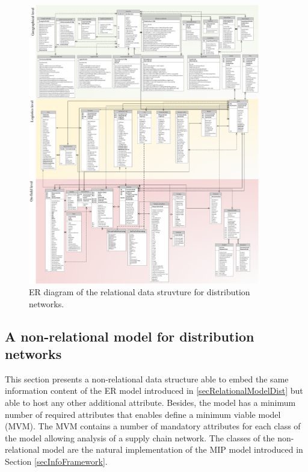 \begin{figure}[hbt!]
\centering
\includegraphics[width=0.9\textwidth]{SectionDistribution/diagnosticModels_figures/fig_dist_ER_model.png}
\captionsetup{type=figure}
\caption{ER diagram of the relational data struvture for distribution networks.}
\label{fig_dist_ER_model}
\end{figure}


\subsection{A non-relational model for distribution networks}
This section presents a non-relational data structure able to embed the same information content of the ER model introduced in \ref{secRelationalModelDist} but able to host any other additional attribute.  Besides, the model has a minimum number of required attributes that enables define a minimum viable model (MVM). The MVM contains a number of mandatory attributes for each class of the model allowing analysis of a supply chain network. The classes of the non-relational model are the natural implementation of the MIP model introduced in Section \ref{secInfoFramework}. \par

